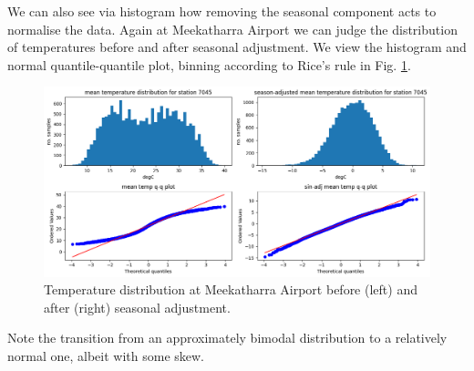 \documentclass[12pt,a4paper]{article} %
\begin{document}
We can also see via histogram how removing the seasonal component acts to normalise the data. Again at Meekatharra Airport we can judge the distribution of temperatures before and after seasonal adjustment. We view the histogram and normal quantile-quantile plot, binning according to Rice's rule in Fig. \ref{fig:7045_distribution}.
\begin{figure}[!ht]
    \centering
    \includegraphics[width=\linewidth]{mean_dist_7045.png}
    \caption{Temperature distribution at Meekatharra Airport before (left) and after (right) seasonal adjustment.}
    \label{fig:7045_distribution}
\end{figure}
Note the transition from an approximately bimodal distribution to a relatively normal one, albeit with some skew.
\end{document}
